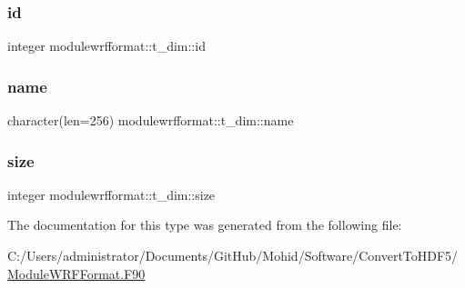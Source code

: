 \subsubsection{\texorpdfstring{id}{id}}
{\footnotesize\ttfamily integer modulewrfformat\+::t\+\_\+dim\+::id\hspace{0.3cm}{\ttfamily [private]}}

\mbox{\label{structmodulewrfformat_1_1t__dim_a1e8f26413e32db9f7a4fd7adca2f3b23}} 
\subsubsection{\texorpdfstring{name}{name}}
{\footnotesize\ttfamily character(len=256) modulewrfformat\+::t\+\_\+dim\+::name\hspace{0.3cm}{\ttfamily [private]}}

\mbox{\label{structmodulewrfformat_1_1t__dim_a6fdba378b3af73656b6d109880ff56c1}} 
\subsubsection{\texorpdfstring{size}{size}}
{\footnotesize\ttfamily integer modulewrfformat\+::t\+\_\+dim\+::size\hspace{0.3cm}{\ttfamily [private]}}



The documentation for this type was generated from the following file\+:\begin{DoxyCompactItemize}
\item 
C\+:/\+Users/administrator/\+Documents/\+Git\+Hub/\+Mohid/\+Software/\+Convert\+To\+H\+D\+F5/\mbox{\hyperlink{_module_w_r_f_format_8_f90}{Module\+W\+R\+F\+Format.\+F90}}\end{DoxyCompactItemize}
